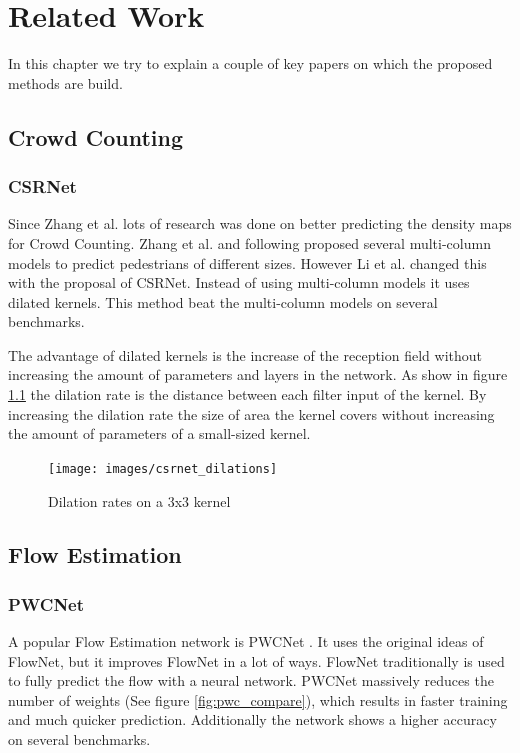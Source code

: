 \chapter{Related Work}
In this chapter we try to explain a couple of key papers on which the proposed methods are build.

\section{Crowd Counting}
\subsection{CSRNet}
Since Zhang et al. \cite{Zhang2016} lots of research was done on better predicting the density maps for Crowd Counting. Zhang et al. and following proposed several multi-column models to predict pedestrians of different sizes. However Li et al. \cite{li2018csrnet} changed this with the proposal of CSRNet. Instead of using multi-column models it uses dilated kernels. This method beat the multi-column models on several benchmarks.

The advantage of dilated kernels is the increase of the reception field without increasing the amount of parameters and layers in the network. As show in figure \ref{fig:csrnet_dilation} the dilation rate is the distance between each filter input of the kernel. By increasing the dilation rate the size of area the kernel covers without increasing the amount of parameters of a small-sized kernel.
\begin{figure}[h]
\centering
\texttt{[image: images/csrnet\_dilations]}
\caption{Dilation rates on a 3x3 kernel}
\label{fig:csrnet_dilation}
\end{figure}


\section{Flow Estimation}

\subsection{PWCNet}

A popular Flow Estimation network is PWCNet \cite{sun_pwc-net_2018}. It uses the original ideas of FlowNet, but it improves FlowNet in a lot of ways. FlowNet traditionally is used to fully predict the flow with a neural network. PWCNet massively reduces the number of weights (See figure \ref{fig:pwc_compare}), which results in faster training and much quicker prediction. Additionally the network shows a higher accuracy on several benchmarks.

